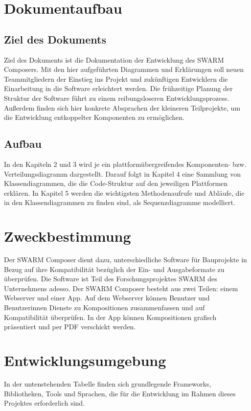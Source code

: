 \section{Dokumentaufbau}\label{sec:dokumentaufbau}
\subsection{Ziel des Dokuments}
Ziel des Dokuments ist die Dokumentation der Entwicklung des SWARM Composers. 
Mit den hier aufgeführten Diagrammen und Erklärungen soll neuen Teammitgliedern der Einstieg ins Projekt und zukünftigen Entwicklern die Einarbeitung in die Software erleichtert werden.
Die frühzeitige Planung der Struktur der Software führt zu einem reibungsloseren Entwicklungsprozess. 
Außerdem finden sich hier konkrete Absprachen der kleineren Teilprojekte, um die Entwicklung entkoppelter Komponenten zu ermöglichen.
\subsection{Aufbau}
In den Kapiteln 2 und 3 wird je ein plattformübergreifendes Komponenten- bzw. Verteilungsdiagramm dargestellt. 
Darauf folgt in Kapitel 4 eine Sammlung von Klassendiagrammen, die die Code-Struktur auf den jeweiligen Plattformen erklären.
In Kapitel 5 werden die wichtigsten Methodenaufrufe und Abläufe, die in den Klassendiagrammen zu finden sind, als Sequenzdiagramme modelliert.


\section{Zweckbestimmung}\label{sec:zweckbestimmung}
Der SWARM Composer dient dazu, unterschiedliche Software für Bauprojekte in Bezug auf ihre Kompatibilität bezüglich der Ein- und Ausgabeformate zu überprüfen. 
Die Software ist Teil des Forschungsprojektes SWARM des Unternehmens adesso. 
Der SWARM Composer besteht aus zwei Teilen: einem Webserver und einer App. 
Auf dem Webserver können Benutzer und Benutzerinnen Dienste zu Kompositionen zusammenfassen und auf Kompatibilität überprüfen.
In der App können Kompositionen grafisch präsentiert und per PDF verschickt werden.
\section{Entwicklungsumgebung}\label{sec:entwicklungsumgebung}
In der untenstehenden Tabelle finden sich grundlegende Frameworks, Bibliotheken, Tools und Sprachen, die für die Entwicklung im Rahmen dieses Projektes erforderlich sind.


